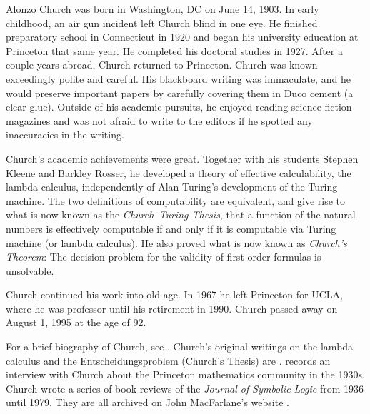 \documentclass[../../../include/open-logic-section]{subfiles}
\begin{document}


Alonzo Church was born in Washington, DC on June 14, 1903.  In early
childhood, an air gun incident left Church blind in one eye. He
finished preparatory school in Connecticut in 1920 and began his
university education at Princeton that same year. He completed his
doctoral studies in 1927. After a couple years abroad, Church returned
to Princeton. Church was known exceedingly polite and careful. His
blackboard writing was immaculate, and he would preserve important
papers by carefully covering them in Duco cement (a clear
glue). Outside of his academic pursuits, he enjoyed reading science
fiction magazines and was not afraid to write to the editors if he
spotted any inaccuracies in the writing.

Church's academic achievements were great.  Together with his students
Stephen Kleene and Barkley Rosser, he developed a theory of effective
calculability, the lambda calculus, independently of Alan Turing's
development of the Turing machine. The two definitions of
computability are equivalent, and give rise to what is now known as
the \emph{Church--Turing Thesis}, that a function of the natural
numbers is effectively computable if and only if it is computable via
Turing machine (or lambda calculus). He also proved what is now known
as \emph{Church's Theorem}: The decision problem for the validity of
first-order formulas is unsolvable.

Church continued his work into old age. In 1967 he left Princeton for
UCLA, where he was professor until his retirement in 1990. Church
passed away on August 1, 1995 at the age of 92.

\begin{reading} 
For a brief biography of Church, see \cite{EndertonND}.  Church's
original writings on the lambda calculus and the Entscheidungsproblem
(Church's Thesis) are \cite{Church1936,Church1936a}.
\cite{Aspray1984} records an interview with Church about the
Princeton mathematics community in the 1930s.
Church wrote a series of book reviews of the \emph{Journal of
Symbolic Logic} from 1936 until 1979. They are all archived on John
MacFarlane's website \cite{MacFarlane2015}.
\end{reading} 
\end{document}
